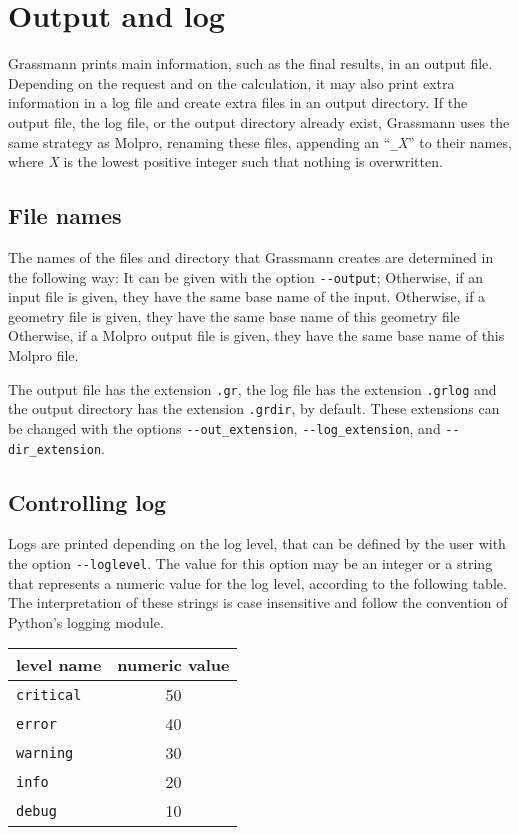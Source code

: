 \hypertarget{chap:output}{}
\chapter{Output and log}
\label{sec:output}
\chapterauthor{}


Grassmann prints main information, such as the final results, in an output file.
Depending on the request and on the calculation,
it may also print extra information in a log file and create extra files in an output directory.
If the output file, the log file, or the output directory already exist,
Grassmann uses the same strategy as Molpro,
renaming these files, appending an ``\verb+_+\emph{X}'' to their names,
where \emph{X} is the lowest positive integer such that nothing is overwritten.

\section{File names}
\label{sec:outname}

The names of the files and directory that Grassmann creates
are determined in the following way:
It can be given with the option \verb+--output+;
Otherwise, if an input file is given, they have the same base name of the input.
Otherwise, if a geometry file is given,
they have the same base name of this geometry file
Otherwise, if a Molpro output file is given,
they have the same base name of this Molpro file.

The output file has the extension \verb+.gr+,
the log file has the extension \verb+.grlog+
and the output directory has the extension \verb+.grdir+, by default.
These extensions can be changed with the options \verb+--out_extension+,
\verb+--log_extension+, and \verb+--dir_extension+.

\section{Controlling log}
\label{sec:controllog}

Logs are printed depending on the log level,
that can be defined by the user with the option \verb+--loglevel+.
The value for this option may be an integer
or a string that represents a numeric value for the log level,
according to the following table.
The interpretation of these strings is case insensitive
and follow the convention of Python's logging module.

\begin{center}
  \begin{tabular}{lc}
    \hline
    level name & numeric value\\
    \hline
    \verb+critical+ & 50 \\
    \verb+error+ & 40\\
    \verb+warning+ & 30\\
    \verb+info+ & 20\\
    \verb+debug+& 10\\
    \hline
  \end{tabular}
\end{center}

